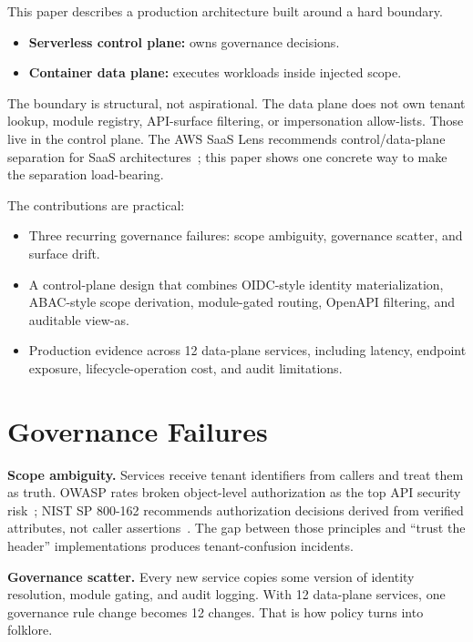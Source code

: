 \documentclass[10pt,journal]{IEEEtran}
\newcommand{\viewas}{view-as}
\begin{document}
This paper describes a production architecture built around a hard boundary.

\begin{itemize}[label=\textbullet, leftmargin=1.2em, topsep=2pt, itemsep=1pt, parsep=0pt]
  \item \textbf{Serverless control plane:} owns governance decisions.
  \item \textbf{Container data plane:} executes workloads inside injected scope.
\end{itemize}

The boundary is structural, not aspirational. The data plane does not own tenant lookup, module registry, API-surface filtering, or impersonation allow-lists. Those live in the control plane. The AWS SaaS Lens recommends control/data-plane separation for SaaS architectures~\cite{aws_saas_lens}; this paper shows one concrete way to make the separation load-bearing.

The contributions are practical:

\begin{itemize}[label=\textcolor{causifyblue}{\textbullet}, leftmargin=1.2em, topsep=2pt, itemsep=1pt, parsep=0pt]
  \item Three recurring governance failures: scope ambiguity, governance scatter, and surface drift.
  \item A control-plane design that combines OIDC-style identity materialization, ABAC-style scope derivation, module-gated routing, OpenAPI filtering, and auditable \viewas{}.
  \item Production evidence across 12 data-plane services, including latency, endpoint exposure, lifecycle-operation cost, and audit limitations.
\end{itemize}

\section{Governance Failures}

\textbf{Scope ambiguity.} Services receive tenant identifiers from callers and treat them as truth. OWASP rates broken object-level authorization as the top API security risk~\cite{owasp_top10}; NIST SP 800-162 recommends authorization decisions derived from verified attributes, not caller assertions~\cite{nist_sp800162}. The gap between those principles and ``trust the header'' implementations produces tenant-confusion incidents.

\textbf{Governance scatter.} Every new service copies some version of identity resolution, module gating, and audit logging. With 12 data-plane services, one governance rule change becomes 12 changes. That is how policy turns into folklore.
\end{document}
